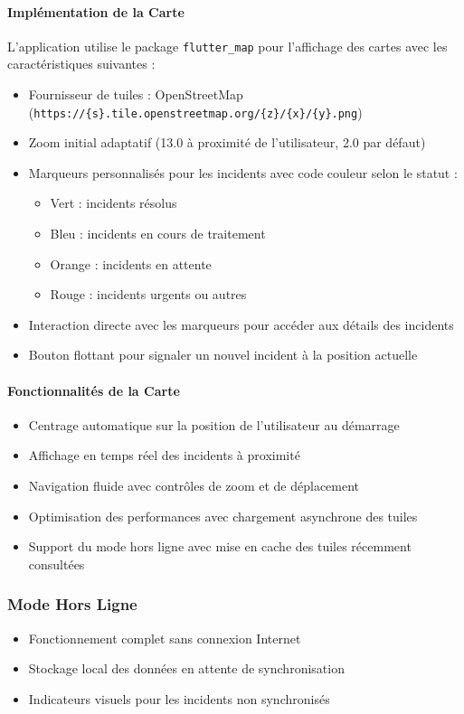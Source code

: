 \documentclass[12pt,a4paper]{article}
\begin{document}
\paragraph{Implémentation de la Carte}
L'application utilise le package \texttt{flutter\_map} pour l'affichage des cartes avec les caractéristiques suivantes :
\begin{itemize}
    \item Fournisseur de tuiles : OpenStreetMap (\texttt{https://\{s\}.tile.openstreetmap.org/\{z\}/\{x\}/\{y\}.png})
    \item Zoom initial adaptatif (13.0 à proximité de l'utilisateur, 2.0 par défaut)
    \item Marqueurs personnalisés pour les incidents avec code couleur selon le statut :
    \begin{itemize}
        \item Vert : incidents résolus
        \item Bleu : incidents en cours de traitement
        \item Orange : incidents en attente
        \item Rouge : incidents urgents ou autres
    \end{itemize}
    \item Interaction directe avec les marqueurs pour accéder aux détails des incidents
    \item Bouton flottant pour signaler un nouvel incident à la position actuelle
\end{itemize}

\paragraph{Fonctionnalités de la Carte}
\begin{itemize}
    \item Centrage automatique sur la position de l'utilisateur au démarrage
    \item Affichage en temps réel des incidents à proximité
    \item Navigation fluide avec contrôles de zoom et de déplacement
    \item Optimisation des performances avec chargement asynchrone des tuiles
    \item Support du mode hors ligne avec mise en cache des tuiles récemment consultées
\end{itemize}

\subsubsection{Mode Hors Ligne}
\begin{itemize}
    \item Fonctionnement complet sans connexion Internet
    \item Stockage local des données en attente de synchronisation
    \item Indicateurs visuels pour les incidents non synchronisés
\end{itemize}
\end{document}
